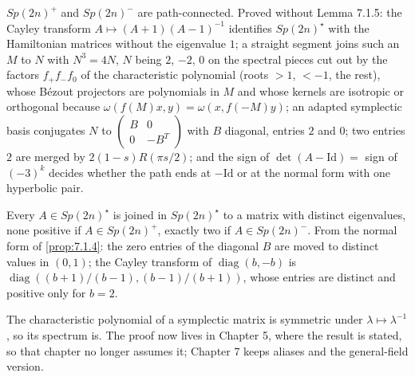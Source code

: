 \begin{proposition}[Proposition 7.1.4]
  \label{prop:7.1.4}
  \leanok
  $Sp(2n)^{+}$ and $Sp(2n)^{-}$ are path-connected.  Proved without Lemma 7.1.5:
  the Cayley transform $A \mapsto (A+1)(A-1)^{-1}$ identifies $Sp(2n)^\star$ with
  the Hamiltonian matrices without the eigenvalue $1$; a straight segment joins
  such an $M$ to $N$ with $N^3 = 4N$, $N$ being $2$, $-2$, $0$ on the spectral
  pieces cut out by the factors $f_+ f_- f_0$ of the characteristic polynomial
  (roots $>1$, $<-1$, the rest), whose Bézout projectors are polynomials in $M$
  and whose kernels are isotropic or orthogonal because
  $\omega(f(M)x, y) = \omega(x, f(-M)y)$; an adapted symplectic basis conjugates
  $N$ to $\begin{pmatrix} B & 0 \\ 0 & -B^{T}\end{pmatrix}$ with $B$ diagonal,
  entries $2$ and $0$; two entries $2$ are merged by $2(1-s)R(\pi s/2)$; and the
  sign of $\det(A-\mathrm{Id}) = $ sign of $(-3)^{k}$ decides whether the path ends
  at $-\mathrm{Id}$ or at the normal form with one hyperbolic pair.
\end{proposition}

\begin{lemma}[Lemma 7.1.5]
  \label{lem:7.1.5}
  \leanok
  Every $A \in Sp(2n)^\star$ is joined in $Sp(2n)^\star$ to a matrix with distinct
  eigenvalues, none positive if $A \in Sp(2n)^+$, exactly two if $A \in Sp(2n)^-$.
  From the normal form of \ref{prop:7.1.4}: the zero entries of the diagonal $B$
  are moved to distinct values in $(0,1)$; the Cayley transform of
  $\operatorname{diag}(b,-b)$ is $\operatorname{diag}((b+1)/(b-1), (b-1)/(b+1))$,
  whose entries are distinct and positive only for $b = 2$.
\end{lemma}

\begin{proposition}
  \label{prop:5.6.4}
  \leanok
  The characteristic polynomial of a symplectic matrix is symmetric under
  $\lambda \mapsto \lambda^{-1}$, so its spectrum is.  The proof now lives in
  Chapter 5, where the result is stated, so that chapter no longer assumes it;
  Chapter 7 keeps aliases and the general-field version.
\end{proposition}

